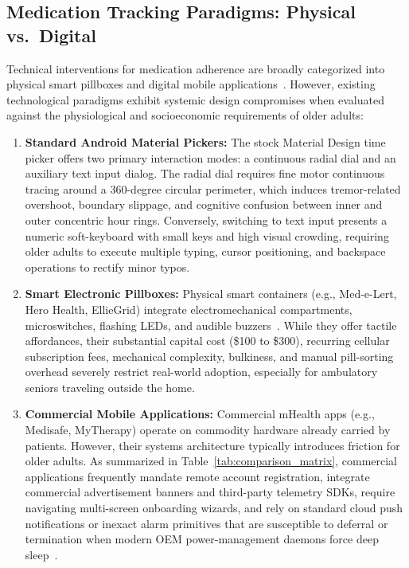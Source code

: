 \documentclass[11pt,a4paper]{article}
\begin{document}
\subsection{Medication Tracking Paradigms: Physical vs.\ Digital}

Technical interventions for medication adherence are broadly categorized into physical smart pillboxes and digital mobile applications~\cite{dayer2013smartphone}. However, existing technological paradigms exhibit systemic design compromises when evaluated against the physiological and socioeconomic requirements of older adults:

\begin{enumerate}[leftmargin=*]
    \item \textbf{Standard Android Material Pickers:} The stock Material Design time picker offers two primary interaction modes: a continuous radial dial and an auxiliary text input dialog. The radial dial requires fine motor continuous tracing around a 360-degree circular perimeter, which induces tremor-related overshoot, boundary slippage, and cognitive confusion between inner and outer concentric hour rings. Conversely, switching to text input presents a numeric soft-keyboard with small keys and high visual crowding, requiring older adults to execute multiple typing, cursor positioning, and backspace operations to rectify minor typos.
    \item \textbf{Smart Electronic Pillboxes:} Physical smart containers (e.g., Med-e-Lert, Hero Health, EllieGrid) integrate electromechanical compartments, microswitches, flashing LEDs, and audible buzzers~\cite{dayer2013smartphone}. While they offer tactile affordances, their substantial capital cost (\$100 to \$300), recurring cellular subscription fees, mechanical complexity, bulkiness, and manual pill-sorting overhead severely restrict real-world adoption, especially for ambulatory seniors traveling outside the home.
    \item \textbf{Commercial Mobile Applications:} Commercial mHealth apps (e.g., Medisafe, MyTherapy) operate on commodity hardware already carried by patients. However, their systems architecture typically introduces friction for older adults. As summarized in Table~\ref{tab:comparison_matrix}, commercial applications frequently mandate remote account registration, integrate commercial advertisement banners and third-party telemetry SDKs, require navigating multi-screen onboarding wizards, and rely on standard cloud push notifications or inexact alarm primitives that are susceptible to deferral or termination when modern OEM power-management daemons force deep sleep~\cite{wildenbos2018aging,google2024offline}.
\end{enumerate}
\end{document}
